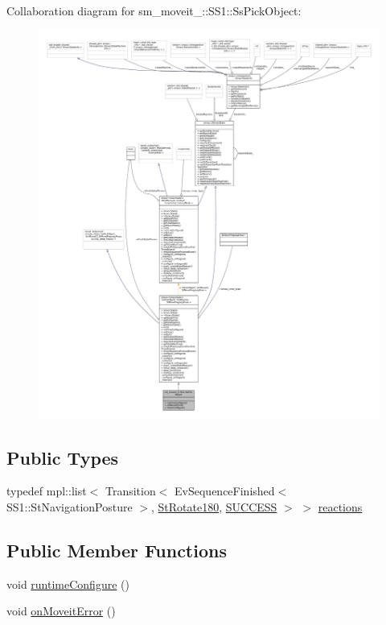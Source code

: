 Collaboration diagram for sm\+\_\+moveit\+\_\+:\+:S\+S1\+:\+:Ss\+Pick\+Object\+:
\nopagebreak
\begin{figure}[H]
\begin{center}
\leavevmode
\includegraphics[width=350pt]{structsm__moveit__2_1_1SS1_1_1SsPickObject__coll__graph}
\end{center}
\end{figure}
\subsection*{Public Types}
\begin{DoxyCompactItemize}
\item 
typedef mpl\+::list$<$ Transition$<$ Ev\+Sequence\+Finished$<$ S\+S1\+::\+St\+Navigation\+Posture $>$, \hyperlink{structsm__moveit__2_1_1StRotate180}{St\+Rotate180}, \hyperlink{classSUCCESS}{S\+U\+C\+C\+E\+SS} $>$ $>$ \hyperlink{structsm__moveit__2_1_1SS1_1_1SsPickObject_a1a8fd3777d596b5a32dc0d9950a64695}{reactions}
\end{DoxyCompactItemize}
\subsection*{Public Member Functions}
\begin{DoxyCompactItemize}
\item 
void \hyperlink{structsm__moveit__2_1_1SS1_1_1SsPickObject_a7545dc96063c5a0930d671c973b13f6e}{runtime\+Configure} ()
\item 
void \hyperlink{structsm__moveit__2_1_1SS1_1_1SsPickObject_af87168e32fc8acb369f87f2ce438bd29}{on\+Moveit\+Error} ()
\end{DoxyCompactItemize}
